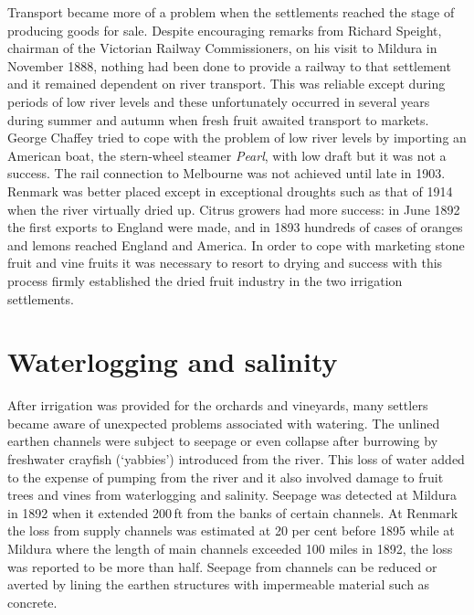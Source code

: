 Transport became more of a problem when the settlements reached the
stage of producing goods for sale.  Despite encouraging remarks from
Richard Speight, chairman of the Victorian Railway Commissioners, on
his visit to Mildura in November 1888, nothing had been done to
provide a railway to that settlement and it remained dependent on
river transport.  This was
reliable except during periods of low river levels and these
unfortunately occurred in several years during summer and autumn when
fresh fruit awaited transport to markets.  George Chaffey tried to cope with the problem of low river
levels by importing an American boat, the stern-wheel steamer
\textsl{Pearl}, with low draft but it was not a success.  The rail connection to Melbourne was not achieved
until late in 1903.  Renmark was better placed except in exceptional
droughts such as that of 1914 when the river virtually dried up.
Citrus growers had more success: in June 1892 the first exports to
England were made, and in 1893 hundreds of cases of oranges and lemons
reached England and America.  In order to cope with marketing stone fruit
and vine fruits it was necessary to resort to drying and success with
this process firmly established the dried fruit industry in the two
irrigation settlements.

\section*{Waterlogging and salinity}

After irrigation was provided for the orchards and vineyards, many
settlers became aware of unexpected problems associated with watering.
The unlined earthen channels were subject to seepage or even collapse
after burrowing by freshwater crayfish (`yabbies') introduced from the
river.  This loss of water added to the expense of pumping from the
river and it also involved damage to fruit trees and vines from
waterlogging and salinity.  Seepage was detected at Mildura in 1892
when it extended 200\,ft from the banks of certain
channels.  At Renmark the loss
from supply channels was estimated at 20 per cent before 1895 while at
Mildura where the length of main channels exceeded 100 miles in 1892,
the loss was reported to be more than half.  Seepage from channels
can be reduced or averted by lining the earthen structures with
impermeable material such as concrete.

